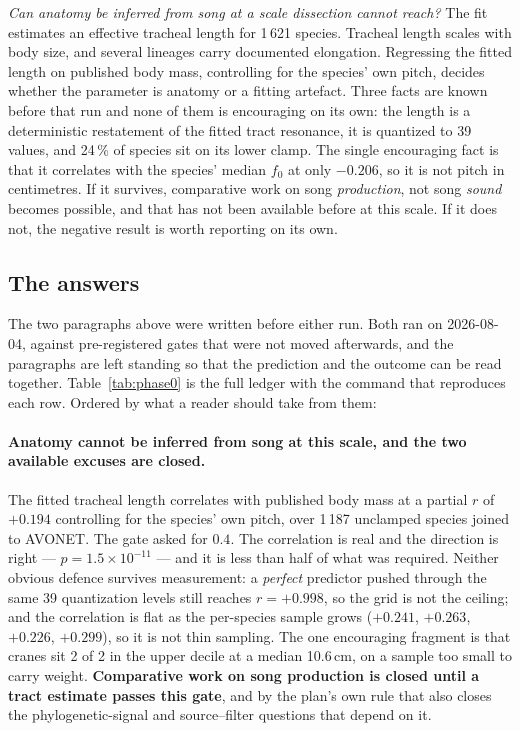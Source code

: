 \documentclass[10pt,twocolumn,a4paper]{article}
\begin{document}
\emph{Can anatomy be inferred from song at a scale dissection cannot reach?} The fit estimates
an effective tracheal length for 1\,621 species. Tracheal length scales with body size, and
several lineages carry documented elongation. Regressing the fitted length on published body
mass, controlling for the species' own pitch, decides whether the parameter is anatomy or a
fitting artefact. Three facts are known before that run and none of them is encouraging on its
own: the length is a deterministic restatement of the fitted tract resonance, it is quantized
to 39 values, and 24\,\% of species sit on its lower clamp. The single encouraging fact is that
it correlates with the species' median $f_0$ at only $-0.206$, so it is not pitch in
centimetres. If it survives, comparative work on song \emph{production}, not song
\emph{sound} becomes possible, and that has not been available before at this scale. If it
does not, the negative result is worth reporting on its own.

\subsection{The answers}
\label{sec:phase0}

The two paragraphs above were written before either run. Both ran on 2026-08-04, against
pre-registered gates that were not moved afterwards, and the paragraphs are left standing
so that the prediction and the outcome can be read together. Table~\ref{tab:phase0} is the
full ledger with the command that reproduces each row. Ordered by what a reader should take
from them:

\paragraph{Anatomy cannot be inferred from song at this scale, and the two available
excuses are closed.} The fitted tracheal length correlates with published body mass at a
partial $r$ of $+0.194$ controlling for the species' own pitch, over 1\,187 unclamped
species joined to AVONET. The gate asked for $0.4$. The correlation is real and the
direction is right --- $p = 1.5\times10^{-11}$ --- and it is less than half of what was
required. Neither obvious defence survives measurement: a \emph{perfect} predictor pushed
through the same 39 quantization levels still reaches $r = +0.998$, so the grid is not the
ceiling; and the correlation is flat as the per-species sample grows ($+0.241$, $+0.263$,
$+0.226$, $+0.299$), so it is not thin sampling. The one encouraging fragment is that cranes
sit 2 of 2 in the upper decile at a median 10.6\,cm, on a sample too small to carry weight.
\textbf{Comparative work on song production is closed until a tract estimate passes this
gate}, and by the plan's own rule that also closes the phylogenetic-signal and
source--filter questions that depend on it.
\end{document}
